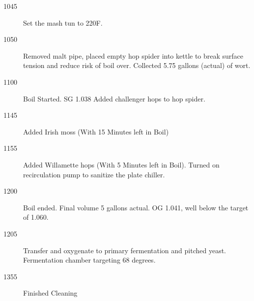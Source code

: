\begin{description}
    \item[1045] Set the mash tun to 220F.
    \item[1050] Removed malt pipe, placed empty hop spider into kettle to break surface tension and reduce risk of boil over.  Collected 5.75 gallons (actual) of wort.
    \item[1100] Boil Started. SG 1.038 Added challenger hops to hop spider.
    \item[1145] Added Irish moss (With 15 Minutes left in Boil)
    \item[1155] Added Willamette hops (With 5 Minutes left in Boil).  Turned on recirculation pump to sanitize the plate chiller.
    \item[1200] Boil ended. Final volume 5 gallons actual. OG 1.041, well below the target of 1.060.
    \item[1205] Transfer and oxygenate to primary fermentation and pitched yeast.  Fermentation chamber targeting 68 degrees.
    \item[1355] Finished Cleaning
\end{description}

